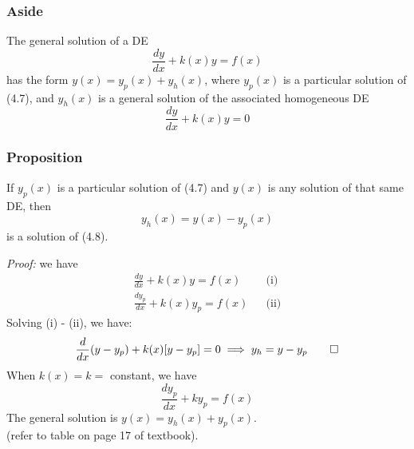\documentclass{report}
\begin{document}
\subsubsection{Aside}
The general solution of a DE
\begin{equation}
\frac{dy}{dx} + k(x)y = f(x)    
\end{equation}
has the form $y(x) = y_p(x) + y_h(x)$, where $y_p(x)$ is a particular solution of (4.7), and $y_h(x)$ is a general solution of the associated homogeneous DE
\begin{equation}
\frac{dy}{dx} + k(x)y = 0    
\end{equation}
\subsubsection{Proposition}
If $y_p(x)$ is a particular solution of (4.7) and $y(x)$ is any solution of that same DE, then
$$y_h(x) = y(x) - y_p(x)$$
is a solution of (4.8).

\vspace{0.3cm}\noindent \textit{Proof:} we have
\begin{align*}
    \frac{dy}{dx} + k(x)y = f(x) && \text{(i)}\\
    \frac{dy_p}{dx} + k(x)y_p = f(x) && \text{(ii)}
\end{align*}
Solving (i) - (ii), we have:
$$\frac{d}{dx}(y - y_p) + k(x)[y - y_p] = 0 \implies y_h = y - y_p \qed$$
When $k(x) = k = $ constant, we have
$$\frac{dy_p}{dx} + ky_p = f(x)$$
The general solution is $y(x) = y_h(x) + y_p(x)$. \\
(refer to table on page 17 of textbook).
\end{document}
